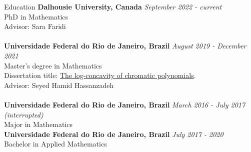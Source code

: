 \documentclass[12pt]{resume} %
\begin{document}

\begin{rSection}{Education}
{\bf Dalhousie University, Canada} \hfill {\em September 2022 - current} 
\\ PhD in Mathematics
\\ Advisor: Sara Faridi
\\
\\{\bf Universidade Federal do Rio de Janeiro, Brazil} \hfill {\em August 2019 - December 2021} 
\\ Master's degree in Mathematics
\\ Dissertation title: \href{https://hollebenthiago.github.io/msc/main.pdf}{The log-concavity of chromatic polynomials}.
\\ Advisor: Seyed Hamid Hassanzadeh
\\
\\
{\bf Universidade Federal do Rio de Janeiro, Brazil} \hfill {\em March 2016 - July 2017 (interrupted)} 
\\ Major in Mathematics\\
{\bf Universidade Federal do Rio de Janeiro, Brazil} \hfill {\em July 2017 - 2020} 
\\ Bachelor in Applied Mathematics
\\
\end{rSection}



\end{document}

